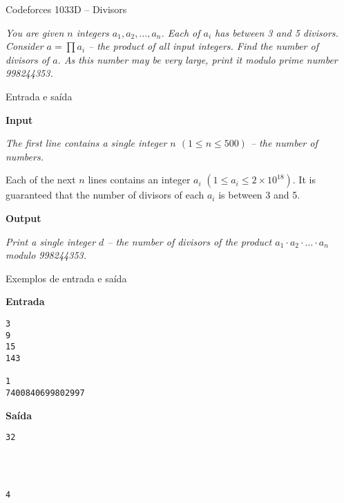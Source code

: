 \begin{frame}[fragile]{Codeforces 1033D -- Divisors}

\it{
You are given $n$ integers $a_1, a_2, \ldots, a_n$. Each of $a_i$ has between 3 and 5 divisors. Consider $a = \prod a_i$ -- 
the product of all input integers. Find the number of divisors of $a$.
As this number may be very large, print it modulo prime number 998244353.
}

\end{frame}

\begin{frame}[fragile]{Entrada e saída}

\textbf{Input}

{\it
The first line contains a single integer $n$ $(1\leq n\leq 500)$ -- the number of numbers.

Each of the next $n$ lines contains an integer $a_i$ $(1\leq a_i\leq 2\times 10^{18})$.  It is guaranteed that the number of divisors of each $a_i$ is between 3
 and 5.
}

\vspace{0.2in}

\textbf{Output}

{\it
Print a single integer $d$ -- the number of divisors of the product $a_1\cdot a_2\cdot \ldots\cdot  a_n$ modulo 998244353.
}

\end{frame}

\begin{frame}[fragile]{Exemplos de entrada e saída}

\begin{minipage}[t]{0.45\textwidth}
\textbf{Entrada}
\begin{verbatim}
3
9
15
143

1
7400840699802997
\end{verbatim}
\end{minipage}
\begin{minipage}[t]{0.5\textwidth}
\textbf{Saída}
\begin{verbatim}
32




4
\end{verbatim}
\end{minipage}

\end{frame}



